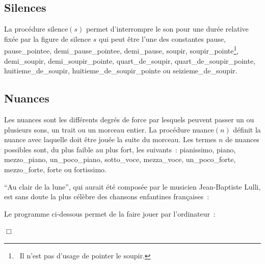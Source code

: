 \subsection{Silences}

La procédure {\idt silence$(s)$} permet d'interrompre le son pour une durée re\-la\-ti\-ve fixée par
la figure de silence $s$ qui peut être l'une des constantes  
  {\idt pause},
  {\idt pause\_pointee},
  {\idt demi\_pause\_pointee},
  {\idt demi\_pause},
  {\idt soupir},
  {\idt sou\-pir\_\-poin\-te}\footnote{\ Il n'est pas d'usage de pointer le soupir.},
  {\idt de\-mi\_\-sou\-pir},
  {\idt demi\_soupir\_pointe},
  {\idt quart\_de\_soupir},
  {\idt quart\_de\_soupir\_pointe},
  {\idt huitieme\_de\_soupir},
  {\idt huit\-ieme\_\-de\_\-sou\-pir\_\-poin\-te}
ou  {\idt seizieme\_de\_soupir}.

\subsection{Nuances}

Les nuances sont les différents degrés de force par lesquels peuvent passer un ou plusieurs sons, un trait
ou un morceau entier. La procédure {\idt nuance$(n)$} définit la nuance avec laquelle doit être jouée
la suite du morceau. Les termes $n$ de nuances possibles sont, du plus faible au plus fort, les suivants~:
{\idt pia\-nis\-si\-mo},
{\idt piano},
{\idt mezzo\_piano},
{\idt un\_poco\_piano},
{\idt sotto\_voce},
{\idt mezza\_voce},
{\idt un\_\-po\-co\_\-for\-te},
{\idt mezzo\_forte},
{\idt forte} ou
{\idt fortissimo}.

\begin{exemple}{\rm
``Au clair de la lune'', qui aurait été composée par le musicien Jean-Baptiste Lulli,
est sans doute la plus célèbre des chansons enfantines françaises~:



\noindent Le programme ci-dessous permet de la faire jouer par l'ordinateur~:

 
\noindent $\Box$ }\end{exemple}

